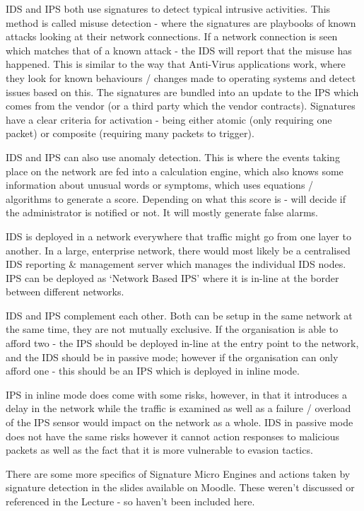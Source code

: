 IDS and IPS both use signatures to detect typical intrusive activities. This method is called misuse detection - where the signatures are playbooks of known attacks looking at their network connections. If a network connection is seen which matches that of a known attack - the IDS will report that the misuse has happened. This is similar to the way that Anti-Virus applications work, where they look for known behaviours / changes made to operating systems and detect issues based on this. The signatures are bundled into an update to the IPS which comes from the vendor (or a third party which the vendor contracts). Signatures have a clear criteria for activation - being either atomic (only requiring one packet) or composite (requiring many packets to trigger). 

IDS and IPS can also use anomaly detection. This is where the events taking place on the network are fed into a calculation engine, which also knows some information about unusual words or symptoms, which uses equations / algorithms to generate a score. Depending on what this score is - will decide if the administrator is notified or not. It will mostly generate false alarms. 

IDS is deployed in a network everywhere that traffic might go from one layer to another. In a large, enterprise network, there would most likely be a centralised IDS reporting \& management server which manages the individual IDS nodes. IPS can be deployed as `Network Based IPS' where it is in-line at the border between different networks. 

IDS and IPS complement each other. Both can be setup in the same network at the same time, they are not mutually exclusive. If the organisation is able to afford two - the IPS should be deployed in-line at the entry point to the network, and the IDS should be in passive mode; however if the organisation can only afford one - this should be an IPS which is deployed in inline mode. 

IPS in inline mode does come with some risks, however, in that it introduces a delay in the network while the traffic is examined as well as a failure / overload of the IPS sensor would impact on the network as a whole. IDS in passive mode does not have the same risks however it cannot action responses to malicious packets as well as the fact that it is more vulnerable to evasion tactics. 

\begin{extlink}
There are some more specifics of Signature Micro Engines and actions taken by signature detection in the slides available on Moodle. These weren't discussed or referenced in the Lecture - so haven't been included here.
\end{extlink}